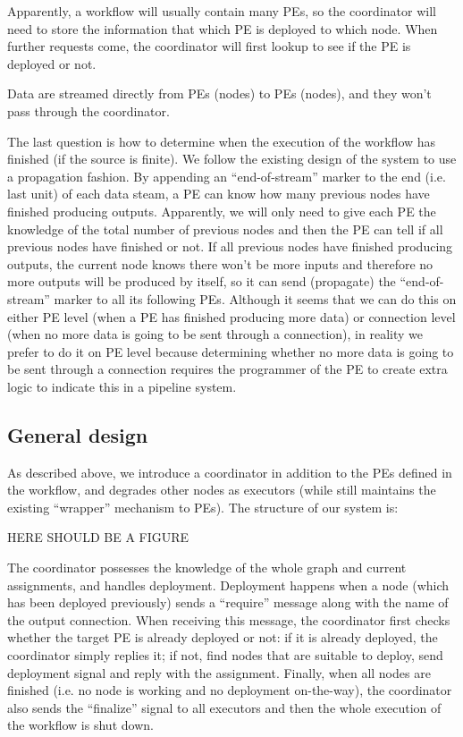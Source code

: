 \documentclass[msc,cs,logo]{infthesis}
\begin{document}
	Apparently, a workflow will usually contain many PEs, so the coordinator will need to store the information that which PE is deployed to which node. When further requests come, the coordinator will first lookup to see if the PE is deployed or not.
	
	Data are streamed directly from PEs (nodes) to PEs (nodes), and they won't pass through the coordinator.

	The last question is how to determine when the execution of the workflow has finished (if the source is finite). We follow the existing design of the system to use a propagation fashion. By appending an ``end-of-stream'' marker to the end (i.e. last unit) of each data steam, a PE can know how many previous nodes have finished producing outputs. Apparently, we will only need to give each PE the knowledge of the total number of previous nodes and then the PE can tell if all previous nodes have finished or not. If all previous nodes have finished producing outputs, the current node knows there won't be more inputs and therefore no more outputs will be produced by itself, so it can send (propagate) the ``end-of-stream'' marker to all its following PEs. Although it seems that we can do this on either PE level (when a PE has finished producing more data) or connection level (when no more data is going to be sent through a connection), in reality we prefer to do it on PE level because determining whether no more data is going to be sent through a connection requires the programmer of the PE to create extra logic to indicate this in a pipeline system.

	\subsection{General design}	
	As described above, we introduce a coordinator in addition to the PEs defined in the workflow, and degrades other nodes as executors (while still maintains the existing ``wrapper'' mechanism to PEs). The structure of our system is:

	HERE SHOULD BE A FIGURE
	
	The coordinator possesses the knowledge of the whole graph and current assignments, and handles deployment. Deployment happens when a node (which has been deployed previously) sends a ``require'' message along with the name of the output connection. When receiving this message, the coordinator first checks whether the target PE is already deployed or not: if it is already deployed, the coordinator simply replies it; if not, find nodes that are suitable to deploy, send deployment signal and reply with the assignment. Finally, when all nodes are finished (i.e. no node is working and no deployment on-the-way), the coordinator also sends the ``finalize'' signal to all executors and then the whole execution of the workflow is shut down.
	 
\end{document}
